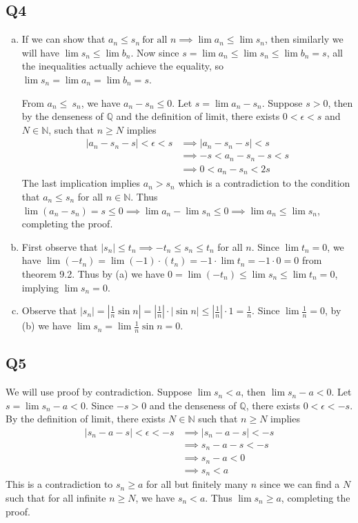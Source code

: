 \documentclass[12pt,lettersize]{article}
\newcommand{\Q}{\mathbb{Q}}
\newcommand{\N}{\mathbb{N}}
\begin{document}
\subsection*{Q4}
\begin{enumerate}[(a)]
	\item If we can show that $a_n\leq s_n\ \text{for all $n$}\implies \lim a_n\leq\lim s_n$, then similarly we will have $\lim s_n\leq\lim b_n$. Now since $s=\lim a_n\leq\lim s_n\leq\lim b_n=s$, all the inequalities actually achieve the equality, so $\lim s_n=\lim a_n=\lim b_n=s$.
	
	From $a_n\leq\ s_n$, we have $a_n-s_n\leq 0$. Let $s=\lim a_n-s_n$. Suppose $s>0$, then by the denseness of $\Q$ and the definition of limit, there exists $0<\epsilon<s$ and $N\in\N$, such that $n\geq N$ implies
	\begin{align*}
		|a_n-s_n-s|<\epsilon<s &\implies |a_n-s_n-s|<s\\
							   &\implies -s<a_n-s_n-s<s\\
							   &\implies 0<a_n-s_n<2s
	\end{align*}
	The last implication implies $a_n>s_n$ which is a contradiction to the condition that $a_n\leq s_n$ for all $n\in\N$. Thus $\lim (a_n-s_n)=s\leq 0\implies \lim a_n - \lim s_n\leq 0 \implies \lim a_n\leq\lim s_n$, completing the proof.
	\item First observe that $|s_n|\leq t_n\implies -t_n\leq s_n\leq t_n$ for all $n$. Since $\lim t_n=0$, we have $\lim(-t_n)=\lim(-1)\cdot(t_n)=-1\cdot\lim t_n=-1\cdot0=0$ from theorem 9.2. Thus by (a) we have $0=\lim(-t_n)\leq\lim s_n\leq\lim t_n=0$, implying $\lim s_n=0$.
	\item Observe that $|s_n|=|\frac{1}{n}\sin n|=|\frac{1}{n}|\cdot|\sin n|\leq|\frac{1}{n}|\cdot1=\frac{1}{n}$. Since $\lim \frac{1}{n}=0$, by (b) we have $\lim s_n=\lim\frac{1}{n}\sin n=0$.
\end{enumerate}
\newpage

\subsection*{Q5}
We will use proof by contradiction. Suppose $\lim s_n< a$, then $\lim s_n-a<0$. Let $s=\lim s_n-a<0$. Since $-s>0$ and the denseness of $\Q$, there exists $0<\epsilon<-s$. By the definition of limit, there exists $N\in\N$ such that $n\geq N$ implies
\begin{align*}
	|s_n-a-s|<\epsilon<-s &\implies |s_n-a-s|<-s\\
						  &\implies s_n-a-s<-s\\
						  &\implies s_n-a<0\\
						  &\implies s_n<a
\end{align*}
This is a contradiction to $s_n\geq a$ for all but finitely many $n$ since we can find a $N$ such that for all infinite $n\geq N$, we have $s_n<a$. Thus $\lim s_n\geq a$, completing the proof.
\end{document}
